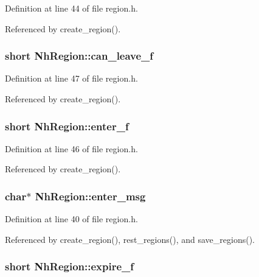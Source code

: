 Definition at line 44 of file region.\+h.



Referenced by create\+\_\+region().

\hypertarget{structNhRegion_aa7d11bf485e368b5a7a0ab0334c8861c}{
\subsubsection[{can\+\_\+leave\+\_\+f}]{\setlength{\rightskip}{0pt plus 5cm}short Nh\+Region\+::can\+\_\+leave\+\_\+f}}\label{structNhRegion_aa7d11bf485e368b5a7a0ab0334c8861c}


Definition at line 47 of file region.\+h.



Referenced by create\+\_\+region().

\hypertarget{structNhRegion_af9c79c43c68e34c27d7e5554abd05196}{
\subsubsection[{enter\+\_\+f}]{\setlength{\rightskip}{0pt plus 5cm}short Nh\+Region\+::enter\+\_\+f}}\label{structNhRegion_af9c79c43c68e34c27d7e5554abd05196}


Definition at line 46 of file region.\+h.



Referenced by create\+\_\+region().

\hypertarget{structNhRegion_ab95bd75bd12288706dce7a9364acc8c7}{
\subsubsection[{enter\+\_\+msg}]{ char$\ast$ Nh\+Region\+::enter\+\_\+msg}}\label{structNhRegion_ab95bd75bd12288706dce7a9364acc8c7}


Definition at line 40 of file region.\+h.



Referenced by create\+\_\+region(), rest\+\_\+regions(), and save\+\_\+regions().

\hypertarget{structNhRegion_ac62d1d5bbe2c6f51caea6b2771db200d}{
\subsubsection[{expire\+\_\+f}]{\setlength{\rightskip}{0pt plus 5cm}short Nh\+Region\+::expire\+\_\+f}}\label{structNhRegion_ac62d1d5bbe2c6f51caea6b2771db200d}



